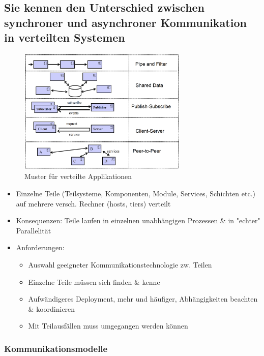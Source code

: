 \documentclass[a4paper]{article}
\begin{document}
		\subsection{Sie kennen den Unterschied zwischen synchroner und asynchroner Kommunikation in verteilten Systemen}
		
		\begin{figure}[!htb]
			\centering
			\includegraphics[keepaspectratio, height=6cm]{img/architecture/muster.png}
			\caption{Muster für verteilte Applikationen}
			\label{fig:muster}
		\end{figure}
	
		\begin{itemize}
			\item Einzelne Teile (Teilsysteme, Komponenten, Module, Services, Schichten etc.)\\
			auf mehrere versch. Rechner (hosts, tiers) verteilt
			\item Konsequenzen: Teile laufen in einzelnen unabhängigen Prozessen \& in "echter" Parallelität
			\item Anforderungen:
				\begin{itemize}
					\item Auswahl geeigneter Kommunikationstechnologie zw. Teilen
					\item Einzelne Teile müssen sich finden \& kenne
					\item Aufwändigeres Deployment, mehr und häufiger, Abhängigkeiten beachten \& koordinieren
					\item Mit Teilausfällen muss umgegangen werden können
				\end{itemize}
		\end{itemize}
	
	\newpage
	
	\subsubsection{Kommunikationsmodelle}
	
\end{document}
